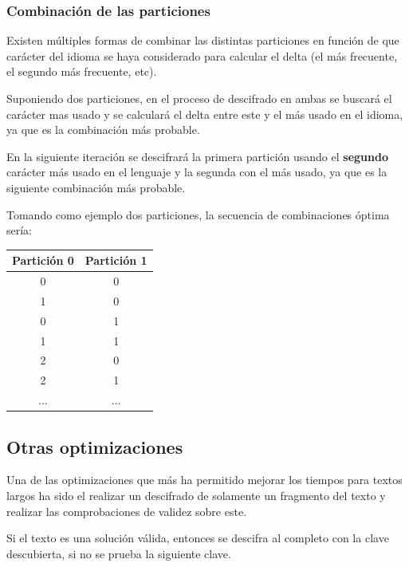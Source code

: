 \documentclass[12pt]{report}
\begin{document}
\subsubsection{Combinación de las particiones}
\label{partition}
Existen múltiples formas de combinar las distintas particiones en función de que carácter del idioma
se haya considerado para calcular el delta (el más frecuente, el segundo más frecuente, etc).

Suponiendo dos particiones, en el proceso de descifrado en ambas se buscará el carácter mas usado y se
calculará el delta entre este y el más usado en el idioma, ya que es la combinación más probable.

En la siguiente iteración se descifrará la primera partición usando el \textbf{segundo} carácter más 
usado en el lenguaje y la segunda con el más usado, ya que es la siguiente combinación más probable.

Tomando como ejemplo dos particiones, la secuencia de combinaciones óptima sería:

\begin{tabular}{|c|c|}
\hline Partición 0 & Partición 1 \\
\hline 0 & 0 \\
\hline 1 & 0 \\
\hline 0 & 1 \\
\hline 1 & 1 \\
\hline 2 & 0 \\
\hline 2 & 1 \\
\hline ... & ... \\
\hline 
\end{tabular}

\subsection{Otras optimizaciones}
\label{snippet}
Una de las optimizaciones que más ha permitido mejorar los tiempos para textos largos ha sido el realizar
un descifrado de solamente un fragmento del texto y realizar las comprobaciones de validez sobre este.

Si el texto es una solución válida, entonces se descifra al completo con la clave descubierta, si no se 
prueba la siguiente clave.
\end{document}
